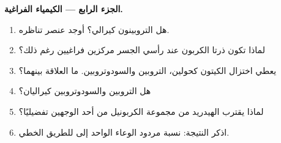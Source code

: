 \begin{problem}
\medskip\noindent\textbf{الجزء الرابع --- الكيمياء الفراغية.}
\begin{enumerate}[resume]
  \item هل التروبينون كيرالي؟ أوجد عنصر تناظره.
  \item لماذا تكون ذرتا الكربون عند رأسي الجسر مركزين فراغيين رغم ذلك؟
  \item يعطي اختزال الكيتون كحولين، التروبين والسودوتروبين. ما
        العلاقة بينهما؟
  \item هل التروبين والسودوتروبين كيراليان؟
  \item لماذا يقترب الهيدريد من مجموعة الكربونيل من أحد الوجهين تفضيليًا؟
  \item اذكر النتيجة: نسبة مردود الوعاء الواحد إلى  للطريق
        الخطي.
\end{enumerate}
\end{problem}
